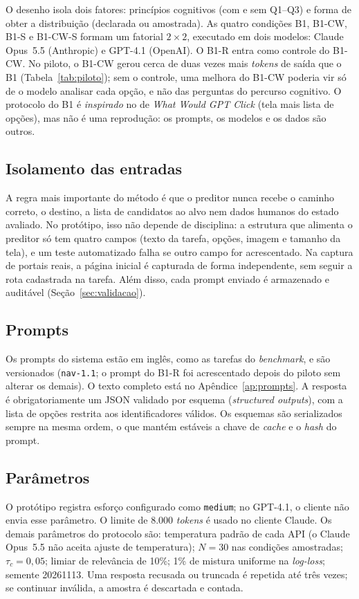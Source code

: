 \documentclass[12pt]{article}
\newcommand{\code}[1]{\texttt{#1}}
\begin{document}
O desenho isola dois fatores: princípios cognitivos (com e sem Q1--Q3) e forma de obter a distribuição (declarada ou amostrada). As quatro condições B1, B1-CW, B1-S e B1-CW-S formam um fatorial $2\times2$, executado em dois modelos: Claude Opus~5.5 (Anthropic) e GPT-4.1 (OpenAI). O B1-R entra como controle do B1-CW. No piloto, o B1-CW gerou cerca de duas vezes mais \textit{tokens} de saída que o B1 (Tabela~\ref{tab:piloto}); sem o controle, uma melhora do B1-CW poderia vir só de o modelo analisar cada opção, e não das perguntas do percurso cognitivo. O protocolo do B1 é \emph{inspirado} no de \textit{What Would GPT Click} \cite{kuric2026wwgc} (tela mais lista de opções), mas não é uma reprodução: os prompts, os modelos e os dados são outros.

\subsection{Isolamento das entradas}
\label{sec:isolamento}

A regra mais importante do método é que o preditor nunca recebe o caminho correto, o destino, a lista de candidatos ao alvo nem dados humanos do estado avaliado. No protótipo, isso não depende de disciplina: a estrutura que alimenta o preditor só tem quatro campos (texto da tarefa, opções, imagem e tamanho da tela), e um teste automatizado falha se outro campo for acrescentado. Na captura de portais reais, a página inicial é capturada de forma independente, sem seguir a rota cadastrada na tarefa. Além disso, cada prompt enviado é armazenado e auditável (Seção~\ref{sec:validacao}).

\subsection{Prompts}
Os prompts do sistema estão em inglês, como as tarefas do \textit{benchmark}, e são versionados (\code{nav-1.1}; o prompt do B1-R foi acrescentado depois do piloto sem alterar os demais). O texto completo está no Apêndice~\ref{ap:prompts}. A resposta é obrigatoriamente um JSON validado por esquema (\textit{structured outputs}), com a lista de opções restrita aos identificadores válidos. Os esquemas são serializados sempre na mesma ordem, o que mantém estáveis a chave de \textit{cache} e o \textit{hash} do prompt.

\subsection{Parâmetros}
O protótipo registra esforço configurado como \code{medium}; no GPT-4.1, o cliente não envia esse parâmetro. O limite de 8.000 \textit{tokens} é usado no cliente Claude. Os demais parâmetros do protocolo são: temperatura padrão de cada API (o Claude Opus~5.5 não aceita ajuste de temperatura); $N=30$ nas condições amostradas; $\tau_c=0{,}05$; limiar de relevância de 10\%; 1\% de mistura uniforme na \textit{log-loss}; semente 20261113. Uma resposta recusada ou truncada é repetida até três vezes; se continuar inválida, a amostra é descartada e contada.
\end{document}
